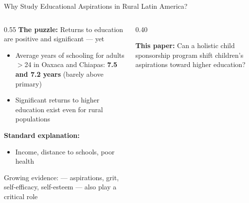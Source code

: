 \documentclass[aspectratio=169, 10pt]{beamer}
\begin{document}
\begin{frame}{Why Study Educational Aspirations in Rural Latin America?}
  \begin{columns}
    \begin{column}{0.55\textwidth}
      \textbf{The puzzle:} Returns to education are positive and significant — yet 
      \begin{itemize}
        \item Average years of schooling for adults $>$24 in Oaxaca and Chiapas: \textbf{7.5 and 7.2 years} (barely above primary)
        \item Significant returns to higher education exist even for rural populations
      \end{itemize}
      \vspace{0.5em}
      \textbf{Standard explanation:} 
      \begin{itemize}
        \item Income, distance to schools, poor health
      \end{itemize}
      \vspace{0.5em}
      \begin{keybox}
        Growing evidence:  — aspirations, grit, self-efficacy, self-esteem — also play a critical role \citep{Cunha2009, Dalton2016, Heckman2012}
      \end{keybox}
    \end{column}
    \begin{column}{0.40\textwidth}
      \begin{methodbox}
        \small
        \textbf{This paper:} Can a holistic child sponsorship program shift children's aspirations toward higher education?
      \end{methodbox}
    \end{column}
  \end{columns}
\end{frame}
\end{document}

